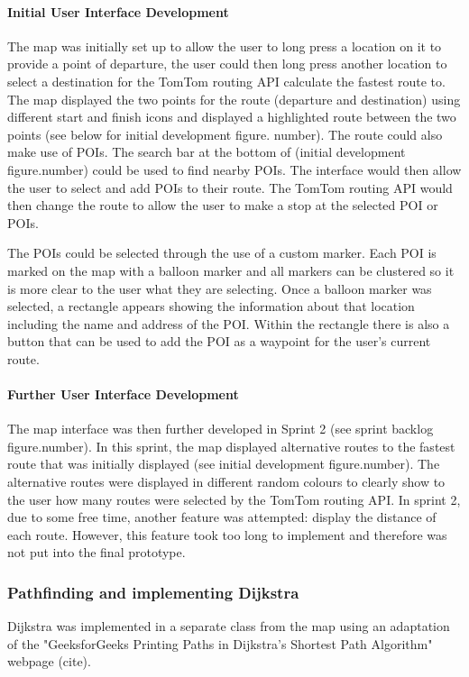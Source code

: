 \documentclass[12pt,a4paper]{article}
\begin{document}
\paragraph{Initial User Interface Development}

 The map was initially set up to allow the user to long press a location on it to provide a point of departure, the user could then long press another location to select a destination for the TomTom routing API calculate the fastest route to. The map displayed the two points for the route (departure and destination) using different start and finish icons and displayed a highlighted route between the two points (see below for initial development figure. number). The route could also make use of POIs. The search bar at the bottom of (initial development figure.number) could be used to find nearby POIs. The interface would then allow the user to select and add POIs to their route. The TomTom routing API would then change the route to allow the user to make a stop at the selected POI or POIs.

 The POIs could be selected through the use of a custom marker. Each POI is marked on the map with a balloon marker and all markers can be clustered so it is more clear to the user what they are selecting. Once a balloon marker was selected, a rectangle appears showing the information about that location including the name and address of the POI. Within the rectangle there is also a button that can be used to add the POI as a waypoint for the user's current route.

\paragraph{Further User Interface Development}
The map interface was then further developed in Sprint 2 (see sprint backlog figure.number). In this sprint, the map displayed alternative routes to the fastest route that was initially displayed (see initial development figure.number). The alternative routes were displayed in different random colours to clearly show to the user how many routes were selected by the TomTom routing API. In sprint 2, due to some free time, another feature was attempted: display the distance of each route. However, this feature took too long to implement and therefore was not put into the final prototype.

\subsubsection{Pathfinding and implementing Dijkstra}
Dijkstra was implemented in a separate class from the map using an adaptation of the "GeeksforGeeks Printing Paths in Dijkstra's Shortest Path Algorithm" webpage (cite). 
\end{document}
